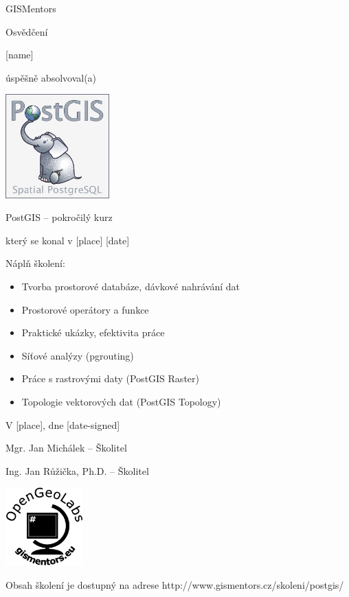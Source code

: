 \documentclass[12pt, a4paper]{letter}
\begin{document}
\pagestyle{empty}
\begin{center}

{\Large GISMentors}

{\Huge Osvědčení}

{\Large [name]}

úspěšně absolvoval(a)

\includegraphics[width=0.30\textwidth]{../images/postgis.png}

{\Large PostGIS -- pokročilý kurz}

který se konal v [place] [date]
\end{center}

Náplň školení:

\begin{itemize}
\item Tvorba prostorové databáze, dávkové nahrávání dat
\item Prostorové operátory a funkce
\item Praktické ukázky, efektivita práce
\item Síťové analýzy (pgrouting)
\item Práce s rastrovými daty (PostGIS Raster)
\item Topologie vektorových dat (PostGIS Topology)
\end{itemize}

\vfill
\parbox{7cm}{

    V [place], dne [date-signed]\\

\vfill

    Mgr. Jan Michálek -- Školitel\\

\vfill
    
    Ing. Jan Růžička, Ph.D. -- Školitel

}
\hfill
\parbox{3cm}{
    \includegraphics[width=3cm]{../images/placka.eps}
}


\begin{center}
{\footnotesize Obsah školení je dostupný na adrese
http://www.gismentors.cz/skoleni/postgis/}
\end{center}
\end{document}
